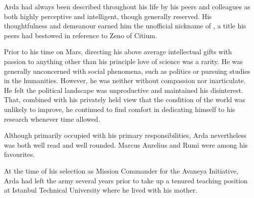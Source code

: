 Arda had always been described throughout his life by his peers and colleagues as both highly perceptive and intelligent, though generally reserved. His thoughtfulness and demeanour earned him the unofficial nickname of , a title his peers had bestowed in reference to Zeno of Citium.

Prior to his time on Mars, directing his above average intellectual gifts with passion to anything other than his principle love of science was a rarity. He was generally unconcerned with social phenomena, such as politics or pursuing studies in the humanities. However, he was neither without compassion nor inarticulate. He felt the political landscape was unproductive and maintained his disinterest. That, combined with his privately held view that the condition of the world was unlikely to improve, he continued to find comfort in dedicating himself to his research whenever time allowed.

Although primarily occupied with his primary responsibilities, Arda nevertheless was both well read and well rounded. Marcus Aurelius and Rumi were among his favourites.

At the time of his selection as Mission Commander for the Avaneya Initiative, Arda had left the army several years prior to take up a tenured teaching position at Istanbul Technical University where he lived with his mother.

